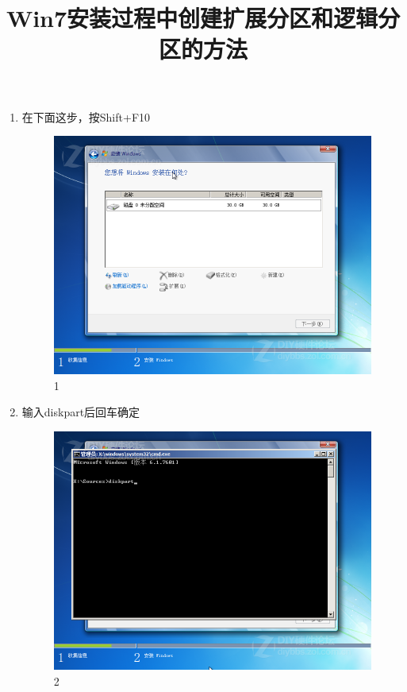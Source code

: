 \documentclass[a4paper,12pt]{article}
\title{Win7安装过程中创建扩展分区和逻辑分区的方法}
\numberwithin{equation}{section}%
\begin{document}
\maketitle
\begin{enumerate}
\item 在下面这步，按Shift+F10
 \begin{figure}[!ht]
  \centering\includegraphics[width=5in]{1.png}
  \caption{1}
  \end{figure}
 \newpage

\item 输入diskpart后回车确定

 \begin{figure}[!ht]
  \centering\includegraphics[width=5in]{2.png}
  \caption{2}
  \end{figure}\newpage


\end{enumerate}
\end{document}
